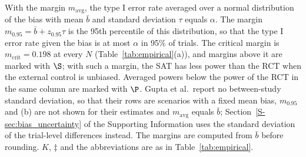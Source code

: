 \begin{table}[!htb]
\begin{minipage}{0.95\linewidth}
With the margin $m_{\mathrm{avg}}$, the type I error rate averaged over a normal distribution of the bias with mean $\bar{b}$ and standard deviation $\tau$ equals $\alpha$. The margin $m_{0.95} = \bar{b} + z_{0.95}\tau$ is the 95th percentile of this distribution, so that the type I error rate given the bias is at most $\alpha$ in 95\% of trials. The critical margin is $m_{\mathrm{crit}} = 0.198$ at every $N$ (Table~\ref{tab:empirical}(a)), and margins above it are marked with $\S$; with such a margin, the SAT has less power than the RCT when the external control is unbiased. Averaged powers below the power of the RCT in the same column are marked with $\P$. Gupta et al.\ report no between-study standard deviation, so that their rows are scenarios with a fixed mean bias, $m_{0.95}$ and (b) are not shown for their estimates and $m_{\mathrm{avg}}$ equals $\bar{b}$; Section~\ref{S-sec:bias_uncertainty} of the Supporting Information uses the standard deviation of the trial-level differences instead. The margins are computed from $\bar{b}$ before rounding. $K$, $\ddagger$ and the abbreviations are as in Table~\ref{tab:empirical}.
\end{minipage}
\end{table}
